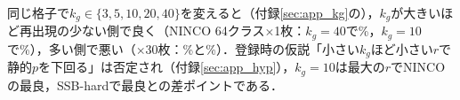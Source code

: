 同じ格子で$k_g\in\{3,5,10,20,40\}$を変えると（付録\ref{sec:app_kg}の），$k_g$が大きいほど再出現の少ない側で良く（NINCO 64クラス$\times$1枚：$k_g{=}40$で\NKgNincoKgFourZeroROneMainFpr\%，$k_g{=}10$で\NKgNincoKgOneZeroROneMainFpr\%），多い側で悪い（$\times$30枚：\NKgNincoKgFourZeroRThreeZeroMainFpr\%と\NKgNincoKgOneZeroRThreeZeroMainFpr\%）．登録時の仮説「小さい$k_g$ほど小さい$r$で静的$p$を下回る」は否定され（付録\ref{sec:app_hyp}），$k_g{=}10$は最大の$r$でNINCOの最良，SSB-hardで最良との差\NKgSsbHardKgOneZeroMinusBestRmaxFpr{}ポイントである．
